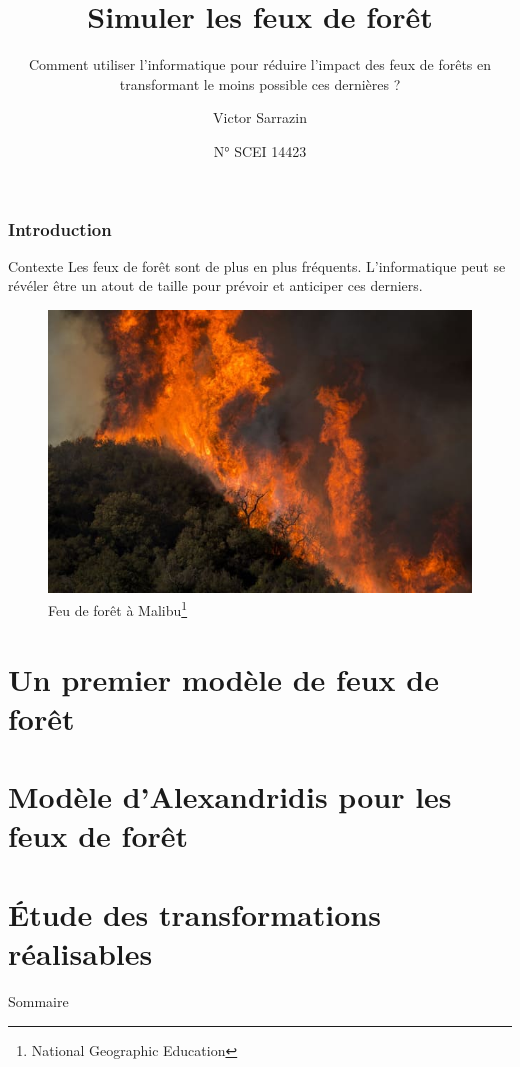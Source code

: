 \documentclass{beamer}
\title{Simuler les feux de forêt}
\subtitle{Comment utiliser l'informatique pour réduire l'impact des feux de forêts en transformant le moins possible ces dernières ?}
\author{Victor Sarrazin}
\date{N° SCEI 14423}
\begin{document}

\begin{frame}

    \titlepage

\end{frame}

\begin{frame}
    \frametitle{Introduction \hyperlink{jump}{\beamerbutton{ }} \hypertarget{1}{\beamerbutton{ }}}

    \begin{block}{Contexte}
        Les feux de forêt sont de plus en plus fréquents. L'informatique peut se révéler être un atout de taille pour prévoir et anticiper ces derniers.
    \end{block}

    \begin{figure}
        \centering
        \includegraphics[width=0.5\linewidth]{pictures/intro.jpg}
        \caption{Feu de forêt à Malibu\footnote{National Geographic Education}}
        \label{fig:enter-label}
    \end{figure}
\end{frame}


\section{Un premier modèle de feux de forêt}
\section{Modèle d'Alexandridis pour les feux de forêt}
\section{Étude des transformations réalisables}

\begin{frame}{Sommaire \hyperlink{jump}{\beamerbutton{ }} \hypertarget{2}{\beamerbutton{ }}}
    \tableofcontents
\end{frame}
\end{document}
